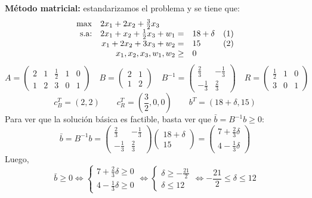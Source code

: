 \documentclass[10pt, aspectratio=169]{beamer}
\begin{document}
\begin{frame}{}\small
    \textbf{Método matricial:} estandarizamos el problema y se tiene que:
            $$
    \begin{array}{rrlc}
    \max & \multicolumn{2}{l}{2x_1+2x_2+\frac{3}{2}x_3}\\
    \text{s.a:}& 2x_1+x_2+\frac{1}{2}x_3 + w_1 = & 18+\delta & (1)\\
     & x_1+2x_2+3x_3 + w_2 = & 15 & (2)\\
     & x_1, x_2, x_3, w_1, w_2\geq & 0 \\
    \end{array}
    $$
    \[A=
    \left(\begin{matrix} 
    2 & 1 & \frac{1}{2} & 1 & 0 \\
    1 & 2 & 3 & 0 & 1
    \end{matrix}\right)
    \quad 
    B=\left(
    \begin{matrix}
    2 & 1 \\
    1 & 2
    \end{matrix}
    \right)
    \quad
        B^{-1}=\left(
    \begin{matrix}
    \frac{2}{3} & -\frac{1}{3} \\
    -\frac{1}{3} & \frac{2}{3}
    \end{matrix}
    \right)
    \quad
    R=\left(
    \begin{matrix}
    \frac{1}{2} & 1 & 0 \\
    3 & 0 & 1
    \end{matrix}
    \right)
    \]
    \[ c_B^T=(2,2) \qquad c_R^T=(\frac{3}{2},0,0) \qquad b^T=(18+\delta, 15)
    \]
    Para ver que la solución básica es factible, basta ver que $\bar{b}=B^{-1}b\geq 0$:
    \[ \bar{b} = B^{-1}b = \left(
    \begin{matrix}
    \frac{2}{3} & -\frac{1}{3} \\
    -\frac{1}{3} & \frac{2}{3}
    \end{matrix}
    \right) \left(\begin{matrix}
    18+\delta \\
    15
    \end{matrix}\right) = \left(\begin{matrix}
    7+\frac{2}{3}\delta \\
    4-\frac{1}{3}\delta
    \end{matrix}\right)\]
    Luego, 
    \[ \bar{b}\geq 0 \Leftrightarrow \begin{cases} 7+\frac{2}{3}\delta \geq 0 \\ 4-\frac{1}{3}\delta \geq 0 \end{cases} \Leftrightarrow \begin{cases} \delta \geq -\frac{21}{2} \\
         \delta \leq 12 \end{cases} \Leftrightarrow -\frac{21}{2}\leq\delta\leq 12 \]
\end{frame}
\end{document}
